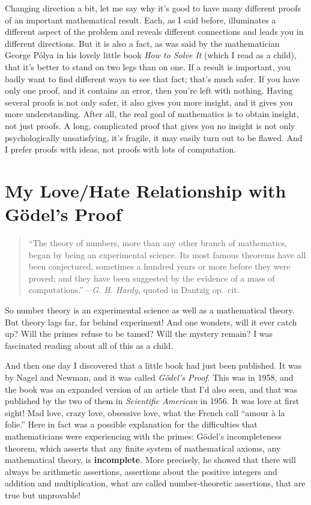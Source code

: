 \documentclass[12pt]{book}
\begin{document}
Changing direction a bit, let me say why it's good to have many different proofs of an important
mathematical result.  Each, as I said before, illuminates a different aspect of the problem and
reveals different connections and leads you in different directions.  
But it is also a fact, as was said by the mathematician George
P\'olya in his lovely little book \emph{How to Solve It} (which I read as a child), 
that it's better
to stand on two legs than on one.  If a result is important, you badly want to find different
ways to see that fact; that's much safer.  If you have only one proof, and it contains an error,
then you're left with nothing.
Having several proofs is not only safer, it also gives you more insight, 
and it gives you more understanding.
After all, the real goal of mathematics is to obtain insight, not just proofs.
A long, 
complicated proof that gives you no insight is not only psychologically unsatisfying, it's fragile,
it may easily turn out to be flawed.
And I prefer proofs with ideas, not proofs with lots of computation.

\section*{My Love/Hate Relationship with G\"odel's Proof}

\begin{quote}
``The theory of numbers, more than any other branch of mathematics, began by being
an experimental science. Its most famous theorems have all been conjectured,
sometimes a hundred years or more before they were proved; and they have been
suggested by the evidence of a mass of computations.''\emph{---G. H. Hardy,} quoted in Dantzig op.\ cit.\
\end{quote}

So number theory is an experimental science as well as a mathematical theory.
But theory lags far, far behind experiment!
And one wonders, will it ever catch up?
Will the primes refuse to be tamed?
Will the mystery remain?
I was fascinated reading about all of this as a child.

And then one day I discovered that a little book had just been published.
It was by Nagel and Newman, and it was called \emph{G\"odel's Proof}.
This was in 1958, and the book was an expanded version of an article that
I'd also seen, and that was published by the two of them in \emph{Scientific American} in 1956.
It was love at first sight!  Mad love, crazy love, obsessive love, what the French
call ``amour \`a la folie.''
Here in fact was a possible explanation for the difficulties that mathematicians were
experiencing with the primes: G\"odel's incompleteness theorem, which asserts
that any finite system of mathematical axioms, any mathematical theory, is \textbf{incomplete}. 
More precisely, he showed that there will always be arithmetic assertions,
assertions about the positive integers and addition and multiplication, what are called
number-theoretic assertions, that are true but unprovable!
\end{document}

